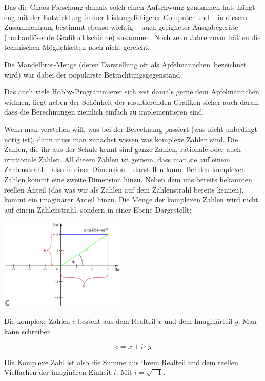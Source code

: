 Das die Chaos-Forschung damals solch einen Aufschwung genommen hat, hängt eng
mit der Entwicklung immer leistungsfähigerer Computer und -- in diesem
Zusammenhang bestimmt ebenso wichtig -- auch geeigneter Ausgabegeräte
(hochauflösende Grafikbildschirme) zusammen. Noch zehn Jahre zuvor hätten die
technischen Möglichkeiten noch nicht gereicht.

Die Mandelbrot-Menge (deren Darstellung oft als \glqq Apfelmännchen\grqq\
bezeichnet wird) war dabei der populärste Betrachtungsgegenstand.

Das auch viele Hobby-Programmierer sich seit damals gerne dem Apfelmännchen
widmen, liegt neben der Schönheit der resultierenden Grafiken sicher auch daran,
dass die Berechnungen ziemlich einfach zu implementieren sind.

Wenn man verstehen will, was bei der Berechnung passiert (was nicht unbedingt
nötig ist), dann muss man zunächst wissen was komplexe Zahlen sind. Die Zahlen,
die ihr aus der Schule kennt sind ganze Zahlen, rationale oder auch irrationale
Zahlen. All diesen Zahlen ist gemein, dass man sie auf einem Zahlenstrahl --
also in einer Dimension -- darstellen kann. Bei den komplexen Zahlen kommt eine
zweite Dimension hinzu. Neben dem uns bereits bekannten reellen Anteil (das was
wir als Zahlen auf dem Zahlenstrahl bereits kennen), kommt ein imaginärer Anteil
hinzu. Die Menge der komplexen Zahlen wird nicht auf einem Zahlenstrahl,
sondern in einer Ebene Dargestellt:

\begin{center}
\includegraphics[width=0.45\textwidth]{./inf/SEKII/18_Java_Arrays/Komplexe_Zahlenebene.png}
\end{center}

Die komplexe Zahlen $c$ besteht aus dem Realteil $x$ und dem Imaginärteil $y$.
Man kann schreiben

\[
c = x + i \cdot y
\]

Die Komplexe Zahl ist also die Summe aus ihrem Realteil und dem reellen
Vielfachen der imaginären Einheit $i$. Mit $i = \sqrt{-1}$.


